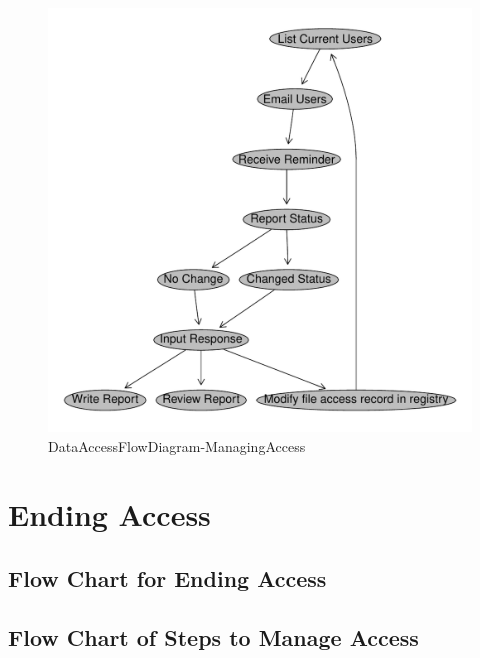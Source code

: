 \documentclass[a4paper]{article}
\begin{document}
\begin{figure}[!h]
\centering
\includegraphics[width=\textwidth]{DataAccessFlowDiagram-ManagingAccess.pdf}
\caption{DataAccessFlowDiagram-ManagingAccess}
\label{fig:DataAccessFlowDiagram-ManagingAccess}
\end{figure}
\clearpage
\section{Ending Access}
\label{sec-5}
\subsection{Flow Chart for Ending Access}
\label{sec-5-1}
\subsection{Flow Chart of Steps to Manage Access}
\label{sec-5-2}
\end{document}

